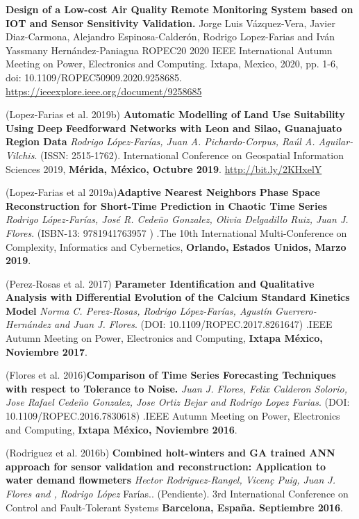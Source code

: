 \begin{innerlist}

\item \textbf{Design of a Low-cost Air Quality Remote Monitoring System based on IOT and Sensor Sensitivity Validation.} Jorge Luis Vázquez-Vera, Javier Diaz-Carmona, Alejandro Espinosa-Calderón, Rodrigo Lopez-Farias and Iván Yassmany Hernández-Paniagua ROPEC20 2020 IEEE International Autumn Meeting on Power, Electronics and Computing. Ixtapa, Mexico, 2020, pp. 1-6, doi: 10.1109/ROPEC50909.2020.9258685. \url{https://ieeexplore.ieee.org/document/9258685}


\item (Lopez-Farias et al. 2019b) \textbf{Automatic Modelling of Land Use Suitability Using Deep Feedforward Networks with Leon and
Silao, Guanajuato Region Data} \textit{Rodrigo López-Farías, Juan A. Pichardo-Corpus, Raúl A. Aguilar-Vilchis}. (ISSN: 2515-1762). {International Conference on Geospatial Information Sciences 2019}, \textbf{Mérida, México, Octubre 2019}. \url{http://bit.ly/2KHxelY}

\item (Lopez-Farias et al 2019a)\textbf{Adaptive Nearest Neighbors Phase Space Reconstruction for Short-Time Prediction in Chaotic Time Series} \textit{Rodrigo López-Farías, José R. Cedeño Gonzalez, Olivia Delgadillo Ruiz, Juan J. Flores}. (ISBN-13: 9781941763957 ) .{The 10th International Multi-Conference on Complexity, Informatics and Cybernetics}, \textbf{Orlando, Estados Unidos, Marzo 2019}.


\item (Perez-Rosas et al. 2017) \textbf{Parameter Identification and Qualitative Analysis with Differential Evolution of the Calcium Standard Kinetics Model} \textit{Norma C. Perez-Rosas, Rodrigo López-Farías, Agustín Guerrero-Hernández and Juan J. Flores}. (DOI: 10.1109/ROPEC.2017.8261647) .{IEEE Autumn Meeting on Power, Electronics and Computing}, \textbf{Ixtapa México, Noviembre 2017}.


\item (Flores et al. 2016)\textbf{Comparison of Time Series Forecasting Techniques with respect to Tolerance to Noise.} \textit{Juan J. Flores, Felix Calderon Solorio, Jose Rafael Cede\~no Gonzalez, Jose Ortiz Bejar and Rodrigo Lopez Farias}. (DOI: 10.1109/ROPEC.2016.7830618) .{IEEE Autumn Meeting on Power, Electronics and Computing}, \textbf{Ixtapa México, Noviembre 2016}.


\item (Rodriguez et al. 2016b) \textbf{Combined holt-winters and GA trained ANN approach for sensor validation and reconstruction: Application to water demand flowmeters} \textit{Hector Rodriguez-Rangel, Vicen\c{c} Puig, Juan J. Flores and ,  Rodrigo López} Farías.. (Pendiente). {3rd International Conference on Control and Fault-Tolerant Systems} \textbf{Barcelona, España. Septiembre 2016}.


\end{innerlist}
